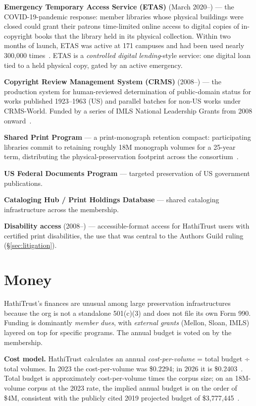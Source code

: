 \documentclass[10pt,letterpaper,twocolumn]{article}
\begin{document}
\textbf{Emergency Temporary Access Service (ETAS)} (March 2020--) --- the COVID-19-pandemic response: member libraries whose physical buildings were closed could grant their patrons time-limited online access to digital copies of in-copyright books that the library held in its physical collection. Within two months of launch, ETAS was active at 171 campuses and had been used nearly 300{,}000 times~\citep{hathicovid2020,etasterms}. ETAS is a \emph{controlled digital lending}-style service: one digital loan tied to a held physical copy, gated by an active emergency.

\textbf{Copyright Review Management System (CRMS)} (2008--) --- the production system for human-reviewed determination of public-domain status for works published 1923--1963 (US) and parallel batches for non-US works under CRMS-World. Funded by a series of IMLS National Leadership Grants from 2008 onward~\citep{hathicrms}.

\textbf{Shared Print Program} --- a print-monograph retention compact: participating libraries commit to retaining roughly 18M monograph volumes for a 25-year term, distributing the physical-preservation footprint across the consortium~\citep{wikipediahathi}.

\textbf{US Federal Documents Program} --- targeted preservation of US government publications.

\textbf{Cataloging Hub / Print Holdings Database} --- shared cataloging infrastructure across the membership.

\textbf{Disability access} (2008--) --- accessible-format access for HathiTrust users with certified print disabilities, the use that was central to the Authors Guild ruling (\S\ref{sec:litigation}).

\section{Money}\label{sec:money}

HathiTrust's finances are unusual among large preservation infrastructures because the org is not a standalone 501(c)(3) and does not file its own Form 990. Funding is dominantly \emph{member dues}, with \emph{external grants} (Mellon, Sloan, IMLS) layered on top for specific programs. The annual budget is voted on by the membership.

\textbf{Cost model.} HathiTrust calculates an annual \emph{cost-per-volume} = total budget ÷ total volumes. In 2023 the cost-per-volume was \$0.2294; in 2026 it is \$0.2403~\citep{hathicost,hathi2026budget}. Total budget is approximately cost-per-volume times the corpus size; on an 18M-volume corpus at the 2023 rate, the implied annual budget is on the order of \$4M, consistent with the publicly cited 2019 projected budget of \$3{,}777{,}445~\citep{wikipediahathi}.
\end{document}
